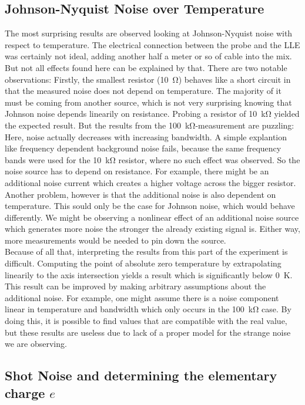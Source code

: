 \documentclass[
    parskip=half, 
    twoside=false,
    twocolumn=true,
    fontsize=11pt,
]{scrarticle}
\begin{document}
\subsection{Johnson-Nyquist Noise over Temperature}
The most surprising results are observed looking at Johnson-Nyquist noise with respect to temperature. The electrical connection between the probe and the LLE was certainly not ideal, adding another half a meter or so of cable into the mix. But not all effects found here can be explained by that. There are two notable observations: Firstly, the smallest resistor (\SI{10}{\ohm}) behaves like a short circuit in that the measured noise does not depend on temperature. The majority of it must be coming from another source, which is not very surprising knowing that Johnson noise depends linearily on resistance. Probing a resistor of \SI{10}{\kilo\ohm} yielded the expected result. But the results from the \SI{100}{\kilo\ohm}-measurement are puzzling: Here, noise actually decreases with increasing bandwidth. A simple explantion like frequency dependent background noise fails, because the same frequency bands were used for the \SI{10}{\kilo\ohm} resistor, where no such effect was observed. So the noise source has to depend on resistance. For example, there might be an additional noise current which creates a higher voltage across the bigger resistor. Another problem, however is that the additional noise is also dependent on temperature. This sould only be the case for Johnson noise, which would behave differently. We might be observing a nonlinear effect of an additional noise source which generates more noise the stronger the already existing signal is. Either way, more measurements would be needed to pin down the source.\\
Because of all that, interpreting the results from this part of the experiment is difficult. Computing the point of absolute zero temperature by extrapolating linearily to the axis intersection yields a result which is significantly below \SI{0}{\kelvin}. This result can be improved by making arbitrary assumptions about the additional noise. For example, one might assume there is a noise component linear in temperature and bandwidth which only occurs in the \SI{100}{\kilo\ohm} case. By doing this, it is possible to find values that are compatible with the real value, but these results are useless due to lack of a proper model for the strange noise we are observing.

\subsection{Shot Noise and determining the elementary charge $e$}
\end{document}
